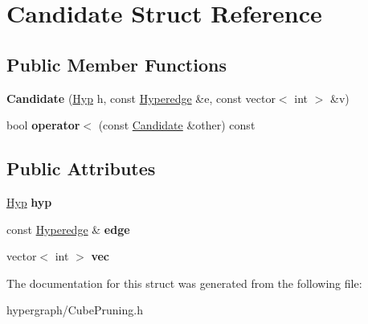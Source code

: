 \hypertarget{struct_candidate}{
\section{Candidate Struct Reference}
\label{struct_candidate}
}
\subsection*{Public Member Functions}
\begin{DoxyCompactItemize}
\item 
\hypertarget{struct_candidate_ac13c7ec637d37b63fc4d6bf3361fd449}{
{\bfseries Candidate} (\hyperlink{struct_hyp}{Hyp} h, const \hyperlink{class_scarab_1_1_h_g_1_1_hyperedge}{Hyperedge} \&e, const vector$<$ int $>$ \&v)}
\label{struct_candidate_ac13c7ec637d37b63fc4d6bf3361fd449}

\item 
\hypertarget{struct_candidate_a5644a3a3d2d92498923ecc443bb4583c}{
bool {\bfseries operator$<$} (const \hyperlink{struct_candidate}{Candidate} \&other) const }
\label{struct_candidate_a5644a3a3d2d92498923ecc443bb4583c}

\end{DoxyCompactItemize}
\subsection*{Public Attributes}
\begin{DoxyCompactItemize}
\item 
\hypertarget{struct_candidate_a22db5a9c75fdebb31827505d6bc7d274}{
\hyperlink{struct_hyp}{Hyp} {\bfseries hyp}}
\label{struct_candidate_a22db5a9c75fdebb31827505d6bc7d274}

\item 
\hypertarget{struct_candidate_acdb6d12cbf33f6e78b97fed5013a181b}{
const \hyperlink{class_scarab_1_1_h_g_1_1_hyperedge}{Hyperedge} \& {\bfseries edge}}
\label{struct_candidate_acdb6d12cbf33f6e78b97fed5013a181b}

\item 
\hypertarget{struct_candidate_afe2daf1c20513a5489d8407492ca7597}{
vector$<$ int $>$ {\bfseries vec}}
\label{struct_candidate_afe2daf1c20513a5489d8407492ca7597}

\end{DoxyCompactItemize}


The documentation for this struct was generated from the following file:\begin{DoxyCompactItemize}
\item 
hypergraph/CubePruning.h\end{DoxyCompactItemize}
